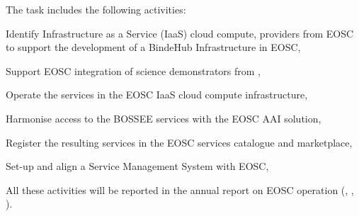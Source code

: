 \begin{task}[
  title=Collaboration with EOSC,
  id=eosc,
  lead=EGI,
  PM=24,
  wphases={12-48},
  partners={SRL,WTT,XFEL}
]
  The task includes the following activities:
  \begin{compactitem}
  \item Identify Infrastructure as a Service (IaaS) cloud compute,
    providers from EOSC to support the development of a BindeHub
    Infrastructure in EOSC,
  \item Support EOSC integration of science demonstrators from ,
  \item Operate the services in the EOSC IaaS cloud compute infrastructure,
  \item Harmonise access to the BOSSEE services with the EOSC AAI solution,
  \item Register the resulting services in the EOSC services catalogue and marketplace,
  \item Set-up and align a Service Management System with EOSC,
  \end{compactitem}

   All these activities will be reported in the annual report on EOSC operation (, , ).
\end{task}
